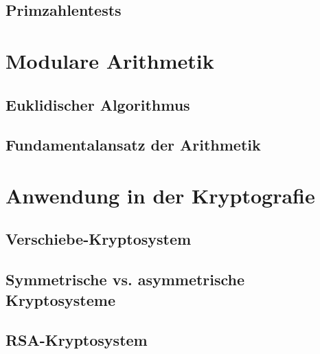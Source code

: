 \documentclass[a4paper,10pt]{article}
\begin{document}
\subsection{Primzahlentests}


\section{Modulare Arithmetik}

\subsection{Euklidischer Algorithmus}
\subsection{Fundamentalansatz der Arithmetik}


\section{Anwendung in der Kryptografie}

\subsection{Verschiebe-Kryptosystem}
\subsection{Symmetrische vs. asymmetrische Kryptosysteme}
\subsection{RSA-Kryptosystem}







\end{document}
